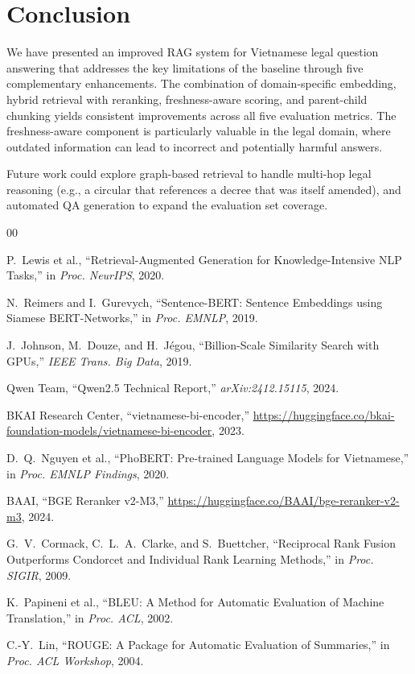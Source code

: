 \documentclass[conference]{IEEEtran}
\begin{document}
\section{Conclusion}

We have presented an improved RAG system for Vietnamese legal question
answering that addresses the key limitations of the baseline through five
complementary enhancements. The combination of domain-specific embedding,
hybrid retrieval with reranking, freshness-aware scoring, and parent-child
chunking yields consistent improvements across all five evaluation metrics.
The freshness-aware component is particularly valuable in the legal domain,
where outdated information can lead to incorrect and potentially harmful answers.

Future work could explore graph-based retrieval to handle multi-hop legal
reasoning (e.g., a circular that references a decree that was itself amended),
and automated QA generation to expand the evaluation set coverage.

\begin{thebibliography}{00}

P.~Lewis et al., ``Retrieval-Augmented Generation for Knowledge-Intensive NLP
Tasks,'' in \textit{Proc. NeurIPS}, 2020.

N.~Reimers and I.~Gurevych, ``Sentence-BERT: Sentence Embeddings using Siamese
BERT-Networks,'' in \textit{Proc. EMNLP}, 2019.

J.~Johnson, M.~Douze, and H.~Jégou, ``Billion-Scale Similarity Search with
GPUs,'' \textit{IEEE Trans. Big Data}, 2019.

Qwen Team, ``Qwen2.5 Technical Report,'' \textit{arXiv:2412.15115}, 2024.

BKAI Research Center, ``vietnamese-bi-encoder,''
\url{https://huggingface.co/bkai-foundation-models/vietnamese-bi-encoder}, 2023.

D.~Q.~Nguyen et al., ``PhoBERT: Pre-trained Language Models for Vietnamese,''
in \textit{Proc. EMNLP Findings}, 2020.

BAAI, ``BGE Reranker v2-M3,''
\url{https://huggingface.co/BAAI/bge-reranker-v2-m3}, 2024.

G.~V.~Cormack, C.~L.~A.~Clarke, and S.~Buettcher, ``Reciprocal Rank Fusion
Outperforms Condorcet and Individual Rank Learning Methods,'' in
\textit{Proc. SIGIR}, 2009.

K.~Papineni et al., ``BLEU: A Method for Automatic Evaluation of Machine
Translation,'' in \textit{Proc. ACL}, 2002.

C.-Y.~Lin, ``ROUGE: A Package for Automatic Evaluation of Summaries,'' in
\textit{Proc. ACL Workshop}, 2004.

\end{thebibliography}
\end{document}
